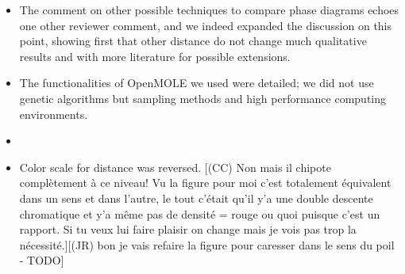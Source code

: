 \documentclass[11pt,a4paper,sans]{moderncv}        %
\begin{document}
\begin{itemize}
	\item The comment on other possible techniques to compare phase diagrams echoes one other reviewer comment, and we indeed expanded the discussion on this point, showing first that other distance do not change much qualitative results and with more literature for possible extensions. 
	
	\item The functionalities of OpenMOLE we used were detailed; we did not use genetic algorithms but sampling methods and high performance computing environments.
	
	\item {}
	
    
	\item Color scale for distance was reversed.
    [(CC) Non mais il chipote complètement à ce niveau! Vu la figure pour moi c'est totalement équivalent dans un sens et dans l'autre, le tout c'était qu'il y'a une double descente chromatique et y'a même pas de densité = rouge ou quoi puisque c'est un rapport. Si tu veux lui faire plaisir on change mais je vois pas trop la nécessité.][(JR) bon je vais refaire la figure pour caresser dans le sens du poil - TODO]
	

\end{itemize}
\end{document}
